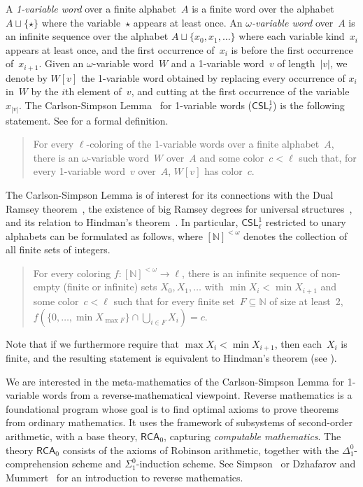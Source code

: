 \documentclass{article}
\numberwithin{theorem}{section}
\newcommand{\RCA}{\mathsf{RCA}}
\newcommand{\CSL}{\mathsf{CSL}}
\newcommand{\NN}{\mathbb{N}}
\begin{document}
A \emph{1-variable word} over a finite alphabet~$A$ is a finite word over the alphabet $A \sqcup \{\star\}$ where the variable~$\star$ appears at least once. An \emph{$\omega$-variable word} over~$A$ is an infinite sequence over the alphabet $A \sqcup \{ x_0, x_1, \dots \}$ where each variable kind~$x_i$ appears at least once, and the first occurrence of~$x_i$ is before the first occurrence of~$x_{i+1}$. Given an $\omega$-variable word~$W$ and a 1-variable word~$v$ of length~$|v|$, we denote by $W[v]$ the 1-variable word obtained by replacing every occurrence of $x_i$ in~$W$ by the $i$th element of~$v$, and cutting at the first occurrence of the variable~$x_{|v|}$.
The Carlson-Simpson Lemma~\cite{carlson1984dual} for 1-variable words ($\CSL^1_\ell$) is the following statement. See  for a formal definition.
\begin{quote}
For every $\ell$-coloring of the 1-variable words over a finite alphabet~$A$, there is an $\omega$-variable word~$W$ over~$A$ and some color~$c < \ell$ such that, for every 1-variable word~$v$ over~$A$, $W[v]$ has color~$c$.
\end{quote}
The Carlson-Simpson Lemma is of interest for its connections with the Dual Ramsey theorem~\cite{carlson1984dual}, the existence of big Ramsey degrees for universal structures~\cite{hubivcka2020big}, and its relation to Hindman's theorem~\cite{Hindman1974Finite}. In particular, $\CSL^1_\ell$ restricted to unary alphabets can be formulated as follows, where $[\NN]^{<\omega}$ denotes the collection of all finite sets of integers.
\begin{quote}
For every coloring $f : [\NN]^{<\omega} \to \ell$, there is an infinite sequence of non-empty (finite or infinite) sets $X_0, X_1, \dots$ with $\min X_i < \min X_{i+1}$ and some color~$c < \ell$ such that for every finite set~$F \subseteq \NN$ of size at least~2, $f(\{0, \dots, \min X_{\max F}\} \cap \bigcup_{i \in F} X_i) = c$.
\end{quote}
Note that if we furthermore require that $\max X_i < \min X_{i+1}$, then each~$X_i$ is finite, and the resulting statement is equivalent to Hindman's theorem (see ).

We are interested in the meta-mathematics of the Carlson-Simpson Lemma for 1-variable words from a reverse-mathematical viewpoint. Reverse mathematics is a foundational program whose goal is to find optimal axioms to prove theorems from ordinary mathematics. It uses the framework of subsystems of second-order arithmetic, with a base theory, $\RCA_0$, capturing \emph{computable mathematics}. The theory $\RCA_0$ consists of the axioms of Robinson arithmetic, together with the $\Delta^0_1$-comprehension scheme and $\Sigma^0_1$-induction scheme. See Simpson~\cite{simpson2009subsystems} or Dzhafarov and Mummert~\cite{dzhafarov2022reverse} for an introduction to reverse mathematics.
\end{document}
